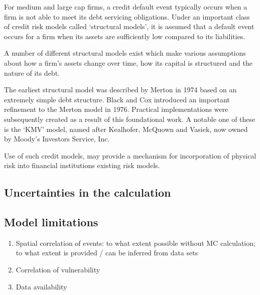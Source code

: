 \documentclass[a4paper,11pt]{extarticle} %
\begin{document}
{For medium and large cap firms, a credit default event typically occurs when a firm is not able to meet its debt servicing obligations. Under an important class of credit risk models called `structural models', it is assumed that a default event occurs for a firm when its assets are sufficiently low compared to its liabilities.

A number of different structural models exist which make various assumptions about how a firm's assets change over time, how its capital is structured and the nature of its debt.

The earliest structural model was described by Merton in 1974 \cite{Merton:1974} based on an extremely simple debt structure. Black and Cox \cite{BlackCox:1976} introduced an important refinement to the Merton model in 1976. Practical implementations were subsequently created as a result of this foundational work. A notable one of these is the `KMV' model, named after Kealhofer, McQuown and Vasiek, now owned by Moody's Investors Service, Inc.

Use of such credit models, may provide a mechanism for incorporation of physical risk into financial institutions existing risk models\cite{KenyonEtAl:2021}.

\subsection{Uncertainties in the calculation}

\subsection{Model limitations}

\begin{enumerate}
    \item Spatial correlation of events: to what extent possible without MC calculation; to what extent is provided / can be inferred from data sets
    \item Correlation of vulnerability
    \item Data availability
\end{enumerate}


}
\end{document}
